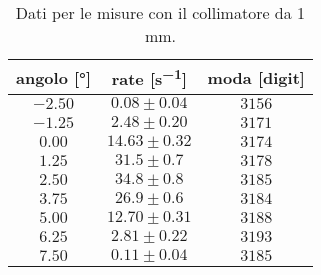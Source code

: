 \begin{table}[h]
\centering

\begin{tabular}{c|c|c}
angolo [\si{\degree}] & rate  [\si{s^{-1}}] & moda [digit] \\
\hline
$ -2.50 $ & $ 0.08 \pm 0.04 $ & $ 3156 $ \\ 
$ -1.25 $ & $ 2.48 \pm 0.20 $ & $ 3171 $ \\ 
$ 0.00 $ & $ 14.63 \pm 0.32 $ & $ 3174 $ \\ 
$ 1.25 $ & $ 31.5 \pm 0.7 $ & $ 3178 $ \\ 
$ 2.50 $ & $ 34.8 \pm 0.8 $ & $ 3185 $ \\ 
$ 3.75 $ & $ 26.9 \pm 0.6 $ & $ 3184 $ \\ 
$ 5.00 $ & $ 12.70 \pm 0.31 $ & $ 3188 $ \\ 
$ 6.25 $ & $ 2.81 \pm 0.22 $ & $ 3193 $ \\ 
$ 7.50 $ & $ 0.11 \pm 0.04 $ & $ 3185 $ \\ 

\end{tabular}

\caption{Dati per le misure con il collimatore da 1\! mm.}
\label{tab:coll1}
\end{table}



%
%
%
%
%
%
